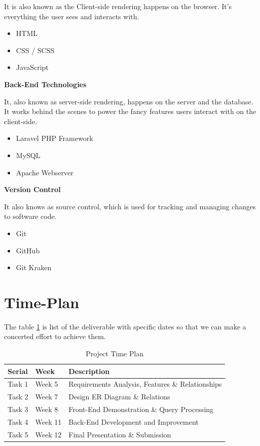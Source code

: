 \documentclass{article}
\begin{document}
\noindent It is also known as the Client-side rendering happens on the browser. It's everything the user sees and interacts with.

\begin{itemize}
    \item HTML
    \item CSS / SCSS
    \item JavaScript
\end{itemize}

\noindent 

\noindent \textbf{Back-End Technologies}

\noindent It, also known as server-side rendering, happens on the server and the database. It works behind the scenes to power the fancy features users interact with on the client-side.

\begin{itemize}
    \item Laravel PHP Framework
    \item MySQL
    \item Apache Webserver
\end{itemize}

\noindent 

\noindent \textbf{Version Control}

\noindent It also knows as source control, which is used for tracking and managing changes to software code.

\begin{itemize}
    \item Git
    \item GitHub
    \item Git Kraken
\end{itemize}

\noindent 


\noindent \section{Time-Plan}

\noindent The table \ref{tab:my_label} is list of the deliverable with specific dates so that we can make a concerted effort to achieve them.

\begin{table}[h!]
    \centering
    \begin{tabular}{|p{0.5in}|p{0.7in}|p{3.2in}|} \hline 
        Serial & Week & Description \\ \hline 
        Task 1 & Week 5 & Requirements Analysis, Features \& Relationships \\ \hline 
        Task 2 & Week 7 & Design ER Diagram \& Relations \\ \hline 
        Task 3 & Week 8 & Front-End Demonstration \& Query Processing  \\ \hline 
        Task 4 & Week 11 & Back-End Development and Improvement \\ \hline 
        Task 5 & Week 12 & Final Presentation \& Submission \\ \hline 
\end{tabular}
    \caption{Project Time Plan}
    \label{tab:my_label}
\end{table}
\end{document}
